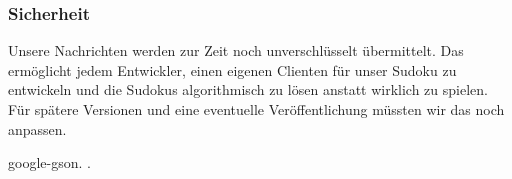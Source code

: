 \subsubsection{Sicherheit}

Unsere Nachrichten werden zur Zeit noch unverschlüsselt übermittelt. Das ermöglicht jedem Entwickler, einen eigenen Clienten für unser Sudoku zu entwickeln und die Sudokus algorithmisch zu lösen anstatt wirklich zu spielen. Für spätere Versionen und eine eventuelle Veröffentlichung müssten wir das noch anpassen. 


{google-gson}.
.
